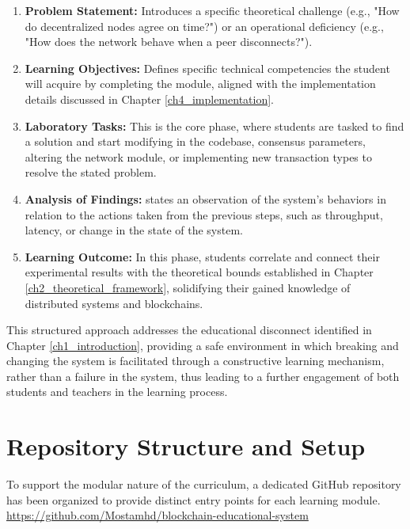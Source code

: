 \begin{enumerate}
    \item \textbf{Problem Statement:} Introduces a specific theoretical challenge (e.g., "How do decentralized nodes agree on time?") or an operational deficiency (e.g., "How does the network behave when a peer disconnects?").
    \item \textbf{Learning Objectives:} Defines specific technical competencies the student will acquire by completing the module, aligned with the implementation details discussed in Chapter \ref{ch4_implementation}.
    \item \textbf{Laboratory Tasks:} This is the core phase, where students are tasked to find a solution and start modifying in the codebase, consensus parameters, altering the network module, or implementing new transaction types to resolve the stated problem.
    \item \textbf{Analysis of Findings:} states an observation of the system's behaviors in relation to the actions taken from the previous steps, such as throughput, latency, or change in the state of the system.
    \item \textbf{Learning Outcome:} In this phase, students correlate and connect their experimental results with the theoretical bounds established in Chapter \ref{ch2_theoretical_framework}, solidifying their gained knowledge of distributed systems and blockchains.
\end{enumerate}

This structured approach addresses the educational disconnect identified in Chapter \ref{ch1_introduction}, providing a safe environment in which breaking and changing the system is facilitated through a constructive learning mechanism, rather than a failure in the system, thus leading to a further engagement of both students and teachers in the learning process.

\newpage

\section{Repository Structure and Setup} \label{ch5_repo_structure}

To support the modular nature of the curriculum, a dedicated GitHub repository has been organized to provide distinct entry points for each learning module. \url{https://github.com/Mostamhd/blockchain-educational-system} \label{ch5_repo_url}

